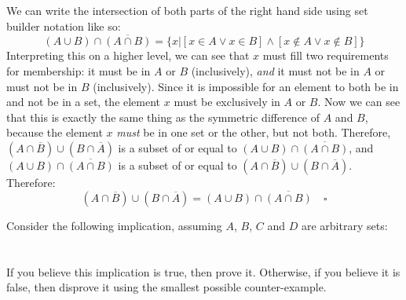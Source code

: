 \documentclass[12pt]{exam}
\begin{document}
\begin{questions}
{\begin{minipage}[t]{14.55cm}
			\begin{center}
				We can write the intersection of both parts of the right hand side using set builder notation like so:
				$$\left(A \cup B\right) \cap \overline{\left(A \cap B\right)} = \{x | \left[x \in A \vee x \in B\right] \wedge \left[x \not\in A \vee x \not\in B\right]\}$$				
				Interpreting this on a higher level, we can see that $x$ must fill two requirements for membership: it must be in $A$ or $B$ (inclusively), \textit{and} it must not be in $A$ or must not be in $B$ (inclusively). Since it is impossible for an element to both be in and not be in a set, the element $x$ must be exclusively in $A$ or $B$. Now we can see that this is exactly the same thing as the symmetric difference of $A$ and $B$, because the element $x$ \textit{must} be in one set or the other, but not both. Therefore, $\left(A \cap \overline{B}\right) \cup \left(B \cap \overline{A}\right)$ is a subset of or equal to $\left( A \cup B \right) \cap \overline{\left( A \cap B \right) }$, and $\left( A \cup B \right) \cap \overline{\left( A \cap B \right) }$ is a subset of or equal to $\left(A \cap \overline{B}\right) \cup \left(B \cap \overline{A}\right)$. Therefore:
				$$\left(A \cap \overline{B}\right) \cup \left(B \cap \overline{A}\right) = \left( A \cup B \right) \cap \overline{\left( A \cap B \right) } \quad \square$$
			\end{center}
			
		\vspace{25pt}
	\end{minipage}
}

\clearpage


	\question[2] Consider the following implication, assuming $A$, $B$, $C$ and $D$ are arbitrary sets:\\  \\
	\\
	If you believe this implication is true, then prove it. Otherwise, if you believe it is false, then disprove it using the smallest possible counter-example. 
		
\end{questions}
\end{document}
